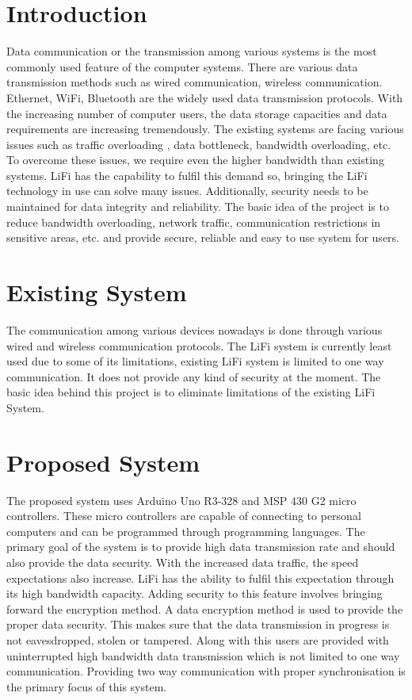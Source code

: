 \documentclass{ijcaArticle}
\begin{document}
\section{Introduction}

Data communication or the transmission among various systems is the most commonly used feature
of the computer systems. There are various data transmission methods such as wired communication,
wireless communication. Ethernet, WiFi, Bluetooth are the widely used data transmission protocols.
With the increasing number of computer users, the data storage capacities and data requirements are
increasing tremendously. The existing systems are facing various issues such as traffic overloading
, data bottleneck, bandwidth overloading, etc. To overcome these issues, we require even the higher
bandwidth than existing systems. LiFi has the capability to fulfil this demand so, bringing the LiFi
technology in use can solve many issues. Additionally, security needs to be maintained for data integrity
and reliability. The basic idea of the project is to reduce bandwidth overloading, network traffic,
communication restrictions in sensitive areas, etc. and provide secure, reliable and easy to use system
for users.



\section{Existing System}
\label{sec:documentclass}
The communication among various devices nowadays is done through various wired and wireless communication protocols. The LiFi system is currently least used due to some of its limitations, existing LiFi system is limited to one  way communication. It does not provide any kind of security at the moment. The basic idea behind this project is to eliminate limitations of the existing LiFi System.
\section{Proposed System}

The proposed system uses Arduino Uno R3-328 and MSP 430 G2 micro controllers. These micro
controllers are capable of connecting to personal computers and can be programmed through programming
languages. The primary goal of the system is to provide high data transmission rate and
should also provide the data security. With the increased data traffic, the speed expectations
also increase. LiFi has the ability to fulfil this expectation through its high bandwidth capacity.
Adding security to this feature involves bringing forward the encryption method. A data encryption method is used to provide the proper data security. This makes sure that the data transmission in progress is not eavesdropped, stolen or tampered. Along with this users are provided with uninterrupted high bandwidth data transmission which is not limited to one way communication. Providing two way communication with proper synchronisation is the primary focus of this system.
\end{document}
